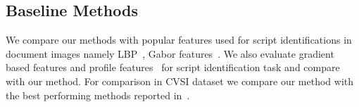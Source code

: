 \subsection{Baseline Methods}
We compare our methods with popular features used for script identifications in document images
namely LBP~\cite{LBPOjala2002}, Gabor features~\cite{Pati}. We also evaluate gradient based features and profile features~\cite{Manmatha12} for script identification task and compare with our method. For comparison in CVSI dataset we compare our method with the best performing methods reported in~\cite{CVSIComp}.


%

